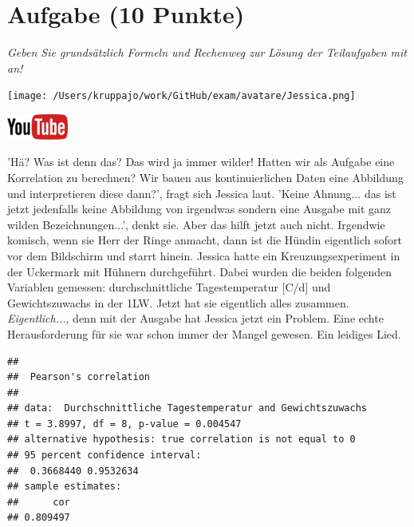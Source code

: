 \documentclass[a4paper, 9pt]{scrartcl}\usepackage[]{graphicx}\usepackage[]{xcolor}
\makeatletter
\newenvironment{kframe}{%
 \def\at@end@of@kframe{}%
 \ifinner\ifhmode%
  \def\at@end@of@kframe{\end{minipage}}%
  \begin{minipage}{\columnwidth}%
 \fi\fi%
 \def\FrameCommand##1{\hskip\@totalleftmargin \hskip-\fboxsep
 \colorbox{shadecolor}{##1}\hskip-\fboxsep
     \hskip-\linewidth \hskip-\@totalleftmargin \hskip\columnwidth}%
 \MakeFramed {\advance\hsize-\width
   \@totalleftmargin\z@ \linewidth\hsize
   \@setminipage}}%
 {\par\unskip\endMakeFramed%
 \at@end@of@kframe}
\newenvironment{knitrout}{}{} %
\makeatother
\begin{document}
\clearpage

\section{Aufgabe \hfill (10 Punkte)}

\textit{Geben Sie grundsätzlich Formeln und Rechenweg zur Lösung der Teilaufgaben mit an!} \\[1Ex]
 

 
\begin{minipage}[t]{0.5\textwidth}
\texttt{[image: /Users/kruppajo/work/GitHub/exam/avatare/Jessica.png]}
\end{minipage}
\begin{minipage}[t]{0.5\textwidth}
\hfill
\href{https://youtu.be/C9skfFRTHhI}{\includegraphics[width = 2cm]{img/youtube}}
\end{minipage}
\vspace{1ex}



'Hä? Was ist denn das? Das wird ja immer wilder! Hatten wir als Aufgabe eine Korrelation zu berechnen? Wir bauen aus kontinuierlichen Daten eine Abbildung und interpretieren diese dann?', fragt sich Jessica laut. 'Keine Ahnung... das ist jetzt jedenfalls keine Abbildung von irgendwas sondern eine \Rlogo Ausgabe mit ganz wilden Bezeichnungen...', denkt sie. Aber das hilft jetzt auch nicht. Irgendwie komisch, wenn sie Herr der Ringe anmacht, dann ist die Hündin eigentlich sofort vor dem Bildschirm und starrt hinein. Jessica hatte ein Kreuzungsexperiment in der Uckermark mit Hühnern durchgeführt. Dabei wurden die beiden folgenden Variablen gemessen: durchschnittliche Tagestemperatur [C/d] und Gewichtszuwachs in der 1LW. Jetzt hat sie eigentlich alles zusammen. \textit{Eigentlich...}, denn mit der \Rlogo Ausgabe hat Jessica jetzt ein Problem. Eine echte Herausforderung für sie war schon immer der Mangel gewesen. Ein leidiges Lied. 


\begin{knitrout}
\color{fgcolor}\begin{kframe}
\begin{verbatim}
## 
## 	Pearson's correlation
## 
## data:  Durchschnittliche Tagestemperatur and Gewichtszuwachs
## t = 3.8997, df = 8, p-value = 0.004547
## alternative hypothesis: true correlation is not equal to 0
## 95 percent confidence interval:
##  0.3668440 0.9532634
## sample estimates:
##      cor 
## 0.809497
\end{verbatim}
\end{kframe}
\end{knitrout}
\end{document}
